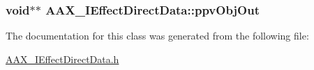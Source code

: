\subsubsection[{ppv\+Obj\+Out}]{\setlength{\rightskip}{0pt plus 5cm}void$\ast$$\ast$ A\+A\+X\+\_\+\+I\+Effect\+Direct\+Data\+::ppv\+Obj\+Out}\label{a00097_a365297b233c5341a924e74d758dc2b5d}


The documentation for this class was generated from the following file\+:\begin{DoxyCompactItemize}
\item 
\hyperlink{a00245}{A\+A\+X\+\_\+\+I\+Effect\+Direct\+Data.\+h}\end{DoxyCompactItemize}
